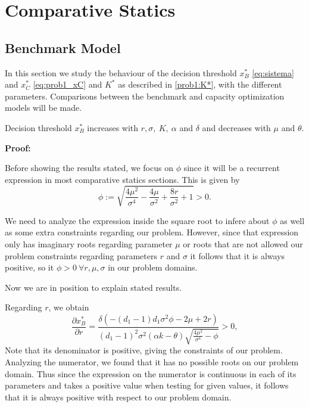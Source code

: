 

\section{Comparative Statics}
\label{prob1:cs}

\subsection{Benchmark Model}
In this section we study the behaviour of the decision threshold $x^*_B$ \eqref{eq:sistema} and $x^*_{C}$ \eqref{eq:prob1_xC} and $K^*$ as described in \eqref{prob1:K*}, with
the different parameters. Comparisons between the benchmark and capacity optimization models will be made.

\begin{prop}
	\label{1_prop1}
Decision threshold $x^*_B$ increases with $r, \sigma, \ K, \ \alpha$ and  $\delta$ and decreases with $\mu$ and $\theta$.
\end{prop}

\textbf{Proof:}

Before showing the results stated, we focus on $\phi$ since it will be a recurrent expression in most comparative statics sections. This is given by
$$\phi:=\sqrt{\frac{4 \mu ^2}{\sigma ^4}-\frac{4 \mu }{\sigma ^2}+\frac{8 r}{\sigma ^2}+1}>0
\label{phi}.$$

We need to analyze the expression inside the square root to infere about $\phi$ as well as some extra constraints regarding our problem. However, since that expression only has imaginary roots regarding parameter $\mu$ or roots that are not allowed our problem constraints regarding parameters $r$ and $\sigma$ it follows that it is always positive, so it $\phi>0 \ \forall r, \mu, \sigma$ in our problem domains.	

Now we are in position to explain stated results.

Regarding $r$, we obtain
$$\frac{\partial x^*_B}{\partial r}=\frac{\delta  \left(-(d_1-1) d_1 \sigma ^2 \phi-2 \mu +2 r \right)}{(d_1-1)^2 \sigma ^2 (\alpha  k-\theta ) \sqrt{\frac{4 \mu ^2}{\sigma ^4}-\phi}}>0,$$
Note that its denominator is positive, giving the constraints of our problem.
Analyzing the numerator, we found that it has no possible roots on our problem domain. Thus since the expression on the numerator is continuous in each of its parameters and takes a positive value when testing for given values, it follows that it is always positive with respect to our problem domain.

